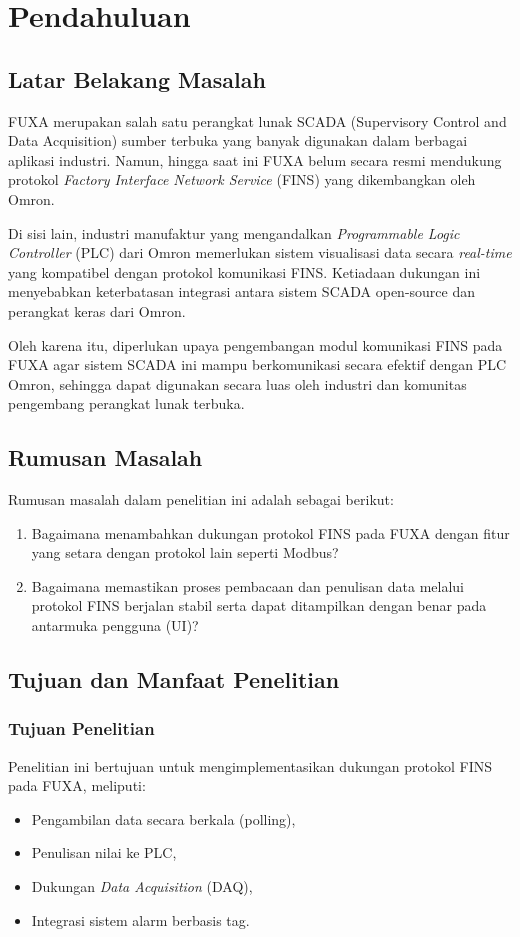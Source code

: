 \chapter{Pendahuluan}

\section{Latar Belakang Masalah}
FUXA merupakan salah satu perangkat lunak SCADA (Supervisory Control and Data Acquisition) sumber terbuka yang banyak digunakan dalam berbagai aplikasi industri. Namun, hingga saat ini FUXA belum secara resmi mendukung protokol \textit{Factory Interface Network Service} (FINS) yang dikembangkan oleh Omron.

Di sisi lain, industri manufaktur yang mengandalkan \textit{Programmable Logic Controller} (PLC) dari Omron memerlukan sistem visualisasi data secara \textit{real-time} yang kompatibel dengan protokol komunikasi FINS. Ketiadaan dukungan ini menyebabkan keterbatasan integrasi antara sistem SCADA open-source dan perangkat keras dari Omron.

Oleh karena itu, diperlukan upaya pengembangan modul komunikasi FINS pada FUXA agar sistem SCADA ini mampu berkomunikasi secara efektif dengan PLC Omron, sehingga dapat digunakan secara luas oleh industri dan komunitas pengembang perangkat lunak terbuka.

\section{Rumusan Masalah}
Rumusan masalah dalam penelitian ini adalah sebagai berikut:
\begin{enumerate}
    \item Bagaimana menambahkan dukungan protokol FINS pada FUXA dengan fitur yang setara dengan protokol lain seperti Modbus?
    \item Bagaimana memastikan proses pembacaan dan penulisan data melalui protokol FINS berjalan stabil serta dapat ditampilkan dengan benar pada antarmuka pengguna (UI)?
\end{enumerate}

\section{Tujuan dan Manfaat Penelitian}
\subsection{Tujuan Penelitian}
Penelitian ini bertujuan untuk mengimplementasikan dukungan protokol FINS pada FUXA, meliputi:
\begin{itemize}
    \item Pengambilan data secara berkala (polling),
    \item Penulisan nilai ke PLC,
    \item Dukungan \textit{Data Acquisition} (DAQ),
    \item Integrasi sistem alarm berbasis tag.
\end{itemize}

